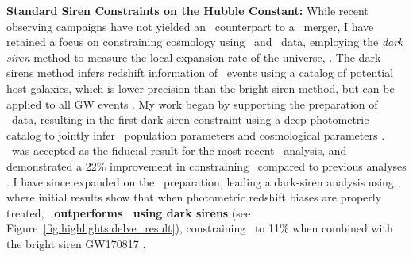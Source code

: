 \textbf{Standard Siren Constraints on the Hubble Constant:}
While recent observing campaigns have not yielded an \EM\ counterpart to a \GW\ merger, I have retained a focus on constraining cosmology using \EM\ and \GW\ data, employing the \textit{dark siren} method to measure the local expansion rate of the universe, \Ho. 
The dark sirens method infers redshift information of \GW\ events using a catalog of potential host galaxies, which is lower precision than the bright siren method, but can be applied to all GW events \cite{2023JCAP...12..023G}.
My work began by supporting the preparation of \DES\ data, resulting in the first dark siren constraint using a deep photometric catalog to jointly infer \GW\ population parameters and cosmological parameters \citep{McMahon2026DESY6H0}. \DES\ was accepted as the fiducial result for the most recent \LVK\ analysis, and demonstrated a 22\% improvement in constraining \Ho\ compared to previous analyses \citep{LVK2026GWTC5}. I have since expanded on the \DES\ preparation, leading a dark-siren analysis using \DELVE, where initial results show that when photometric redshift biases are properly treated, \textbf{\DELVE\ outperforms \DES\ using dark sirens} (see Figure~\ref{fig:highlights:delve_result}), constraining \Ho\ to 11\% when combined with the bright siren GW170817 \citep{MacBride2026DELVEH0}. %
